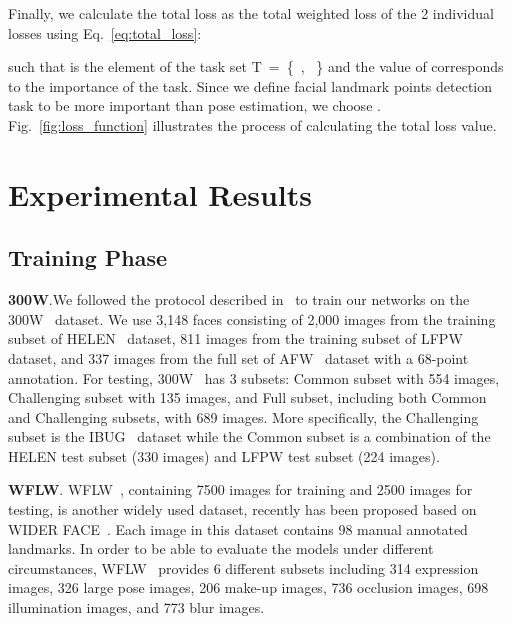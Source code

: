 \documentclass[final]{cvpr}
\begin{document}
Finally, we calculate the total loss as the total weighted loss of the 2 individual losses using Eq.~\ref{eq:total_loss}:

such that \textit{} is the  element of the task set T~=~\{~, ~\} and the value of  corresponds to the importance of the  task. Since we define facial landmark points detection task to be more important than pose estimation, we choose . Fig.~\ref{fig:loss_function} illustrates the process of calculating the total loss value. 
 

\section{Experimental Results}
\label{sec:experiment}


\subsection{Training Phase} \label{sec:training}



\textbf{300W}.We followed the protocol described in~\cite{ren2014face} to train our networks on the 300W~\cite{sagonas2013300} dataset. We use 3,148 faces consisting of 2,000 images from the training subset of HELEN~\cite{le2012interactive} dataset, 811 images from the training subset of LFPW~\cite{belhumeur2013localizing} dataset, and 337 images from the full set of AFW~\cite{zhuramanan2012} dataset with a 68-point annotation. For testing, 300W~\cite{sagonas2013300} has 3 subsets: Common subset with 554 images, Challenging subset with 135 images, and Full subset, including both Common and Challenging subsets, with 689 images. More specifically, the Challenging subset is the IBUG~\cite{sagonas2013300} dataset while the Common subset is a combination of the HELEN test subset (330 images) and LFPW test subset (224 images).



\textbf{WFLW}. WFLW~\cite{wu2018look}, containing 7500 images for training and 2500 images for testing, is another widely used dataset, recently has been proposed based on WIDER FACE~\cite{yang2016wider}. Each image in this dataset contains 98 manual annotated landmarks. In order to be able to evaluate the models under different circumstances, WFLW~\cite{wu2018look} provides 6 different subsets including 314 expression images, 326 large pose images, 206 make-up images, 736 occlusion images, 698 illumination images, and 773 blur images. 
\end{document}
